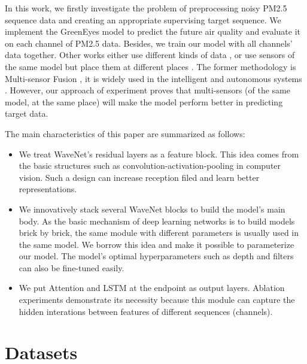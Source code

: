 \documentclass[
twocolumn,
]{ceurart}
\begin{document}
In this work, we firstly investigate the problem of preprocessing noisy PM2.5 sequence data and creating an appropriate supervising target sequence. We implement the GreenEyes model to predict the future air quality and evaluate it on each channel of PM2.5 data. Besides, we train our model with all channels' data together. Other works either use different kinds of data \cite{han2020joint}, or use sensors of the same model but place them at different places \cite{ray2016internet}. The former methodology is Multi-sensor Fusion \cite{wang2019multi}, it is widely used in the intelligent and autonomous systems \cite{luo1989multisensor, hall1997introduction, wang2012towards, cai2020probabilistic}. However, our approach of experiment proves that multi-sensors (of the same model, at the same place) will make the model perform better in predicting target data.

The main characteristics of this paper are summarized as follows:
\begin{itemize}
\item We treat WaveNet's residual layers as a feature block. This idea comes from the basic structures such as convolution-activation-pooling in computer vision. Such a design can increase reception filed and learn better representations.
\item We innovatively stack several WaveNet blocks to build the model's main body. As the basic mechanism of deep learning networks is to build models brick by brick, the same module with different parameters is usually used in the same model. We borrow this idea and make it possible to parameterize our model. The model's optimal hyperparameters such as depth and filters can also be fine-tuned easily.
\item We put Attention \cite{bahdanau2014neural} and LSTM \cite{hochreiter1997long} at the endpoint as output layers. Ablation experiments demonstrate its necessity because this module can capture the hidden interations between features of different sequences (channels).
\end{itemize}


\section{Datasets}\label{sec:data_modeling}
\end{document}
